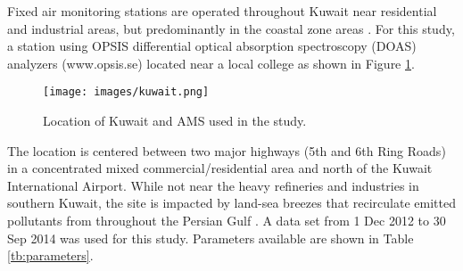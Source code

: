 Fixed air monitoring stations are operated throughout Kuwait near residential and industrial areas, but predominantly in the coastal zone areas \citep{Freeman2017a}. For this study, a station using OPSIS differential optical absorption spectroscopy (DOAS) analyzers (www.opsis.se) located near a local college as shown in Figure \ref{fig:Kuwait}. 
%
\begin{figure}[H]
\centering
\texttt{[image: images/kuwait.png]}
\caption{Location of Kuwait and AMS used in the study.}
\label{fig:Kuwait}
\end{figure}
%
The location is centered between two major highways (5th and 6th Ring Roads) in a concentrated mixed commercial/residential area and north of the Kuwait International Airport. While not near the heavy refineries and industries in southern Kuwait, the site is impacted by land-sea breezes that recirculate emitted pollutants from throughout the Persian Gulf \citep{Freeman2017}. A data set from 1 Dec 2012 to 30 Sep 2014 was used for this study. Parameters available are shown in Table \ref{tb:parameters}.
%


